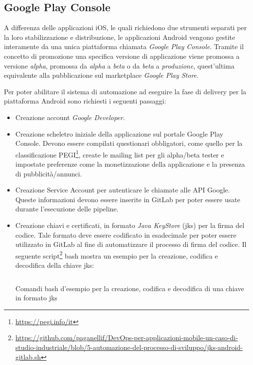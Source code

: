 \subsection{Google Play Console}
A differenza delle applicazioni iOS, le quali richiedono due strumenti separati per la loro stabilizzazione e distribuzione, le applicazioni Android vengono gestite interamente da una unica piattaforma chiamata \textit{Google Play Console}. Tramite il concetto di promozione una specifica versione di applicazione viene promossa a versione \textit{alpha}, promossa da \textit{alpha} a \textit{beta} o da \textit{beta} a \textit{produzione}, quest'ultima equivalente alla pubblicazione sul marketplace \textit{Google Play Store}.

Per poter abilitare il sistema di automazione ad eseguire la fase di delivery per la piattaforma Android sono richiesti i seguenti passaggi:

\begin{itemize}
    \item Creazione account \textit{Google Developer}.
    \item Creazione scheletro iniziale della applicazione sul portale Google Play Console. Devono essere compilati questionari obbligatori, come quello per la classificazione PEGI\footnote{\href{https://pegi.info/it}{https://pegi.info/it}}, create le mailing list per gli alpha/beta tester e impostate preferenze come la monetizzazione della applicazione e la presenza di pubblicità/annunci.
    \item Creazione Service Account per autenticare le chiamate alle API Google. Queste informazioni devono essere inserite in GitLab per poter essere usate durante l'esecuzione delle pipeline.
    \item Creazione chiavi e certificati, in formato \textit{Java KeyStore} (jks) per la firma del codice. Tale formato deve essere codificato in esadecimale per poter essere utilizzato in GitLab al fine di automatizzare il processo di firma del codice. Il seguente script\footnote{\href{https://github.com/paganellif/DevOps-per-applicazioni-mobile-un-caso-di-studio-industriale/blob/5-automazione-del-processo-di-sviluppo/jks-android-gitlab.sh}{https://github.com/paganellif/DevOps-per-applicazioni-mobile-un-caso-di-studio-industriale/blob/5-automazione-del-processo-di-sviluppo/jks-android-gitlab.sh}} bash mostra un esempio per la creazione, codifica e decodifica della chiave jks:

    \begin{listing}[H]
        \inputminted{bash}{code/jks-android-gitlab.sh}
        \caption{Comandi bash d'esempio per la creazione, codifica e decodifica di una chiave in formato jks}
    \end{listing}
\end{itemize}

